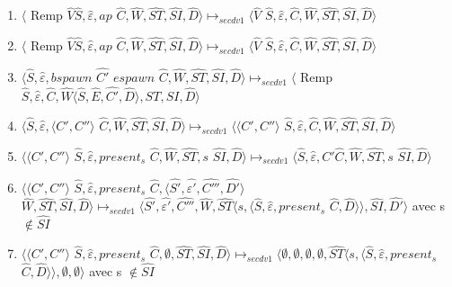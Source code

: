 \documentclass[10pt,a4paper]{article}
\begin{document}
\begin{enumerate}
					\item $\langle$ Remp $\widehat{V}\widehat{S},\widehat{\varepsilon},ap$ $\widehat{C},\widehat{W},\widehat{ST},\widehat{SI},\widehat{D}\rangle \longmapsto_{secdv1} \langle \widehat{V}$ $\widehat{S},\widehat{\varepsilon},\widehat{C},\widehat{W},\widehat{ST},\widehat{SI},\widehat{D}\rangle$
					\item $\langle$ Remp $\widehat{V}\widehat{S},\widehat{\varepsilon},ap$ $\widehat{C},\widehat{W},\widehat{ST},\widehat{SI},\widehat{D}\rangle \longmapsto_{secdv1} \langle \widehat{V}$ $\widehat{S},\widehat{\varepsilon},\widehat{C},\widehat{W},\widehat{ST},\widehat{SI},\widehat{D}\rangle$
					\item $\langle\widehat{S},\widehat{\varepsilon},bspawn$ $\widehat{C'}$ $espawn$ $\widehat{C},\widehat{W},\widehat{ST},\widehat{SI},\widehat{D}\rangle \longmapsto_{secdv1} \langle$ Remp $\widehat{S},\widehat{\varepsilon},\widehat{C},\widehat{W}\langle\widehat{S},\widehat{E},\widehat{C'},\widehat{D}\rangle,\widehat{ST},\widehat{SI},\widehat{D}\rangle$
					\item $\langle\widehat{S},\widehat{\varepsilon},\langle C',C''\rangle$ $\widehat{C},\widehat{W},\widehat{ST},\widehat{SI},\widehat{D}\rangle \longmapsto_{secdv1} \langle\langle C',C''\rangle$ $\widehat{S},\widehat{\varepsilon},\widehat{C},\widehat{W},\widehat{ST},\widehat{SI},\widehat{D}\rangle$
					\item $\langle\langle C',C''\rangle $ $\widehat{S},\widehat{\varepsilon},present_{s}$ $\widehat{C},\widehat{W},\widehat{ST},s$ $\widehat{SI},\widehat{D}\rangle \longmapsto_{secdv1} \langle\widehat{S},\widehat{\varepsilon},C'\widehat{C},\widehat{W},\widehat{ST},s$ $\widehat{SI},\widehat{D}\rangle$
					\item $\langle\langle C',C''\rangle $ $\widehat{S},\widehat{\varepsilon},present_{s}$ $\widehat{C},\langle\widehat{S'},\widehat{\varepsilon'},\widehat{C'''},\widehat{D'}\rangle$ $\widehat{W},\widehat{ST},\widehat{SI},\widehat{D}\rangle \longmapsto_{secdv1} \langle\widehat{S'},\widehat{\varepsilon'},\widehat{C'''},\widehat{W},\widehat{ST}\langle s,\langle\widehat{S},\widehat{\varepsilon},present_{s}$ $\widehat{C},\widehat{D}\rangle\rangle,\widehat{SI},\widehat{D'}\rangle$ avec s $\notin \widehat{SI}$ 
					\item $\langle\langle C',C''\rangle $ $\widehat{S},\widehat{\varepsilon},present_{s}$ $\widehat{C},\emptyset,\widehat{ST},\widehat{SI},\widehat{D}\rangle \longmapsto_{secdv1} \langle\emptyset,\emptyset,\emptyset,\emptyset,\widehat{ST}\langle s,\langle\widehat{S},\widehat{\varepsilon},present_{s}$ $\widehat{C},\widehat{D}\rangle\rangle,\emptyset,\emptyset\rangle$ avec s $\notin \widehat{SI}$ 

\end{enumerate}
\end{document}
